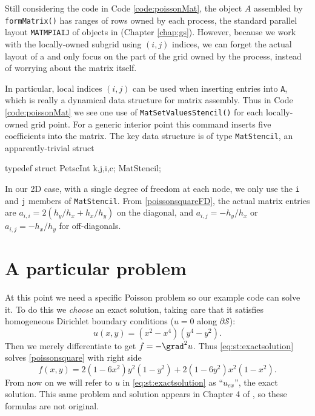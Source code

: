 Still considering the code in Code \ref{code:poissonMat}, the \pMat object $A$ assembled by \texttt{formMatrix()}  has ranges of rows owned by each process, the standard parallel layout \texttt{MATMPIAIJ} of \pMat objects in \PETSc (Chapter \ref{chap:gs}).  However, because we work with the locally-owned subgrid using $(i,j)$ indices, we can forget the actual layout of a \pMat and only focus on the part of the grid owned by the process, instead of worrying about the matrix itself.

In particular, local indices $(i,j)$ can be used when inserting entries into \pMat \texttt{A}, which is really a dynamical data structure for matrix assembly.  Thus in Code \ref{code:poissonMat} we see one use of \texttt{MatSetValuesStencil()} for each locally-owned grid point.  For a generic interior point this command inserts five coefficients into the matrix.  The key data structure is of type \texttt{MatStencil}, an apparently-trivial struct
\begin{code}
typedef struct {
  PetscInt k,j,i,c;
} MatStencil;
\end{code}
In our 2D case, with a single degree of freedom at each node, we only use the \texttt{i} and \texttt{j} members of \texttt{MatStencil}.  From \eqref{poissonsquareFD}, the actual matrix entries are $a_{i,i} = 2\left(h_y/h_x + h_x/h_y\right)$ on the diagonal, and $a_{i,j} = -h_y/h_x$ or $a_{i,j} = -h_x/h_y$ for off-diagonals.


\section{A particular problem}

At this point we need a specific Poisson problem so our example code can solve it.  To do this we \emph{choose} an exact solution, taking care that it satisfies homogeneous Dirichlet boundary conditions ($u=0$ along $\partial \mathcal{S}$):
\begin{equation}
u(x,y) = (x^2 - x^4) (y^4 - y^2). \label{eq:st:exactsolution}
\end{equation}
Then we merely differentiate to get $f = -\grad^2 u$.  Thus \eqref{eq:st:exactsolution} solves \eqref{poissonsquare} with right side
\begin{equation}
f(x,y) = 2 (1 - 6 x^2) y^2 (1 - y^2) + 2 (1 - 6 y^2) x^2 (1 - x^2).\label{manufacturedf}
\end{equation}
From now on we will refer to $u$ in \eqref{eq:st:exactsolution} as ``$u_{ex}$'', the exact solution.  This same problem and solution appears in Chapter 4 of \citep{Briggsetal2000}, so these formulas are not original. %

